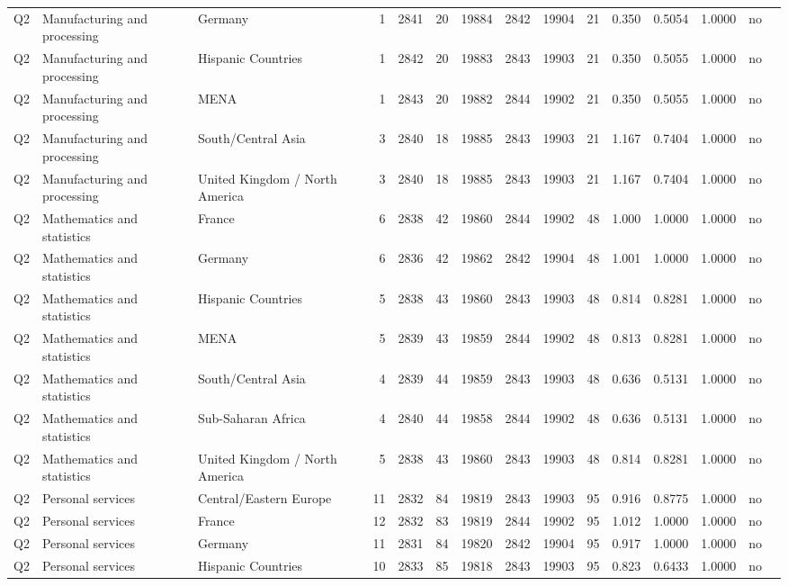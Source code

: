\begin{longtable}{lllrcccccccccll}
Q2 & Manufacturing and processing & Germany & 1 & 2841 & 20 & 19884 & 2842 & 19904 & 21 & 0.350 & 0.5054 & 1.0000 & no \\
Q2 & Manufacturing and processing & Hispanic Countries & 1 & 2842 & 20 & 19883 & 2843 & 19903 & 21 & 0.350 & 0.5055 & 1.0000 & no \\
Q2 & Manufacturing and processing & MENA & 1 & 2843 & 20 & 19882 & 2844 & 19902 & 21 & 0.350 & 0.5055 & 1.0000 & no \\
Q2 & Manufacturing and processing & South/Central Asia & 3 & 2840 & 18 & 19885 & 2843 & 19903 & 21 & 1.167 & 0.7404 & 1.0000 & no \\
Q2 & Manufacturing and processing & United Kingdom / North America & 3 & 2840 & 18 & 19885 & 2843 & 19903 & 21 & 1.167 & 0.7404 & 1.0000 & no \\
Q2 & Mathematics and statistics & France & 6 & 2838 & 42 & 19860 & 2844 & 19902 & 48 & 1.000 & 1.0000 & 1.0000 & no \\
Q2 & Mathematics and statistics & Germany & 6 & 2836 & 42 & 19862 & 2842 & 19904 & 48 & 1.001 & 1.0000 & 1.0000 & no \\
Q2 & Mathematics and statistics & Hispanic Countries & 5 & 2838 & 43 & 19860 & 2843 & 19903 & 48 & 0.814 & 0.8281 & 1.0000 & no \\
Q2 & Mathematics and statistics & MENA & 5 & 2839 & 43 & 19859 & 2844 & 19902 & 48 & 0.813 & 0.8281 & 1.0000 & no \\
Q2 & Mathematics and statistics & South/Central Asia & 4 & 2839 & 44 & 19859 & 2843 & 19903 & 48 & 0.636 & 0.5131 & 1.0000 & no \\
Q2 & Mathematics and statistics & Sub-Saharan Africa & 4 & 2840 & 44 & 19858 & 2844 & 19902 & 48 & 0.636 & 0.5131 & 1.0000 & no \\
Q2 & Mathematics and statistics & United Kingdom / North America & 5 & 2838 & 43 & 19860 & 2843 & 19903 & 48 & 0.814 & 0.8281 & 1.0000 & no \\
Q2 & Personal services & Central/Eastern Europe & 11 & 2832 & 84 & 19819 & 2843 & 19903 & 95 & 0.916 & 0.8775 & 1.0000 & no \\
Q2 & Personal services & France & 12 & 2832 & 83 & 19819 & 2844 & 19902 & 95 & 1.012 & 1.0000 & 1.0000 & no \\
Q2 & Personal services & Germany & 11 & 2831 & 84 & 19820 & 2842 & 19904 & 95 & 0.917 & 1.0000 & 1.0000 & no \\
Q2 & Personal services & Hispanic Countries & 10 & 2833 & 85 & 19818 & 2843 & 19903 & 95 & 0.823 & 0.6433 & 1.0000 & no \\

\end{longtable}
